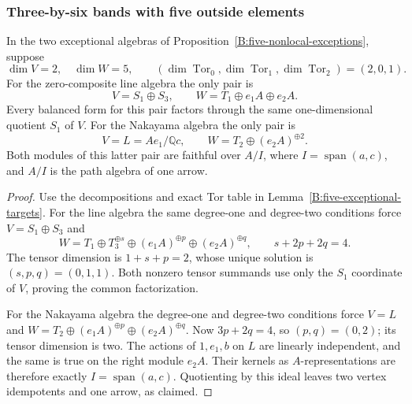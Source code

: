 \subsubsection{Three-by-six bands with five outside elements}

\begin{lemma}\label{B:five-two-by-five-pairs}
In the two exceptional algebras of
Proposition~\ref{B:five-nonlocal-exceptions}, suppose
\[
 \dim V=2,\quad\dim W=5,\qquad
 (\dim\operatorname{Tor}_0,
   \dim\operatorname{Tor}_1,
   \dim\operatorname{Tor}_2)=(2,0,1).
\]
For the zero-composite line algebra the only pair is
\[
 V=S_1\oplus S_3,\qquad
 W=T_1\oplus e_1A\oplus e_2A.
\]
Every balanced form for this pair factors through the same
one-dimensional quotient $S_1$ of $V$.
For the Nakayama algebra the only pair is
\[
 V=L=Ae_1/\mathbb Qc,\qquad
 W=T_2\oplus(e_2A)^{\oplus2}.
\]
Both modules of this latter pair are faithful over
$A/I$, where $I=\operatorname{span}(a,c)$, and
$A/I$ is the path algebra of one arrow.
\end{lemma}
\begin{proof}
Use the decompositions and exact Tor table in
Lemma~\ref{B:five-exceptional-targets}.
For the line algebra the same degree-one and degree-two
conditions force $V=S_1\oplus S_3$ and
\[
 W=T_1\oplus T_3^{\oplus s}\oplus(e_1A)^{\oplus p}
                   \oplus(e_2A)^{\oplus q},\qquad
 s+2p+2q=4.
\]
The tensor dimension is $1+s+p=2$, whose unique solution is
$(s,p,q)=(0,1,1)$.  Both nonzero tensor summands use only
the $S_1$ coordinate of $V$, proving the common factorization.

For the Nakayama algebra the degree-one and degree-two
conditions force $V=L$ and
$W=T_2\oplus(e_1A)^{\oplus p}\oplus(e_2A)^{\oplus q}$.
Now $3p+2q=4$, so $(p,q)=(0,2)$; its tensor dimension is two.
The actions of $1,e_1,b$ on $L$ are linearly independent, and
the same is true on the right module $e_2A$.  Their kernels
as $A$-representations are therefore exactly
$I=\operatorname{span}(a,c)$.  Quotienting by this ideal
leaves two vertex idempotents and one arrow, as claimed.
\end{proof}


